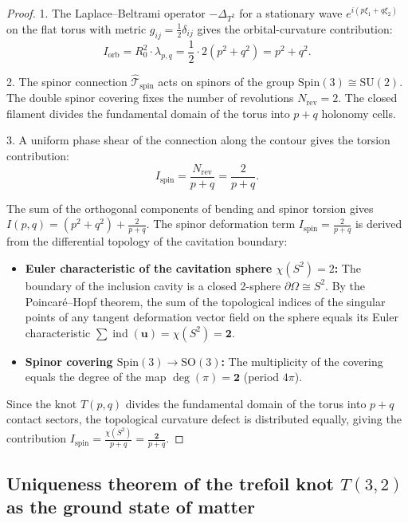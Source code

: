 \documentclass[11pt,a4paper]{article}
\theoremstyle{definition}
\theoremstyle{remark}
\begin{document}
	
\begin{proof}
	1. The Laplace--Beltrami operator $-\Delta_{T^2}$ for a stationary wave $e^{i(p\xi_1 + q\xi_2)}$ on the flat torus with metric $g_{ij} = \frac{1}{2}\delta_{ij}$ gives the orbital-curvature contribution:
\begin{equation}
	I_{\mathrm{orb}} = R_0^2 \cdot \lambda_{p,q} = \frac{1}{2} \cdot 2(p^2 + q^2) = p^2 + q^2.
\end{equation}

2. The spinor connection $\hat{\mathcal{T}}_{\mathrm{spin}}$ acts on spinors of the group $\mathrm{Spin}(3) \cong \mathrm{SU}(2)$. The double spinor covering fixes the number of revolutions $N_{\mathrm{rev}} = 2$. The closed filament divides the fundamental domain of the torus into $p+q$ holonomy cells.

3. A uniform phase shear of the connection along the contour gives the torsion contribution:
\begin{equation}
	I_{\mathrm{spin}} = \frac{N_{\mathrm{rev}}}{p + q} = \frac{2}{p + q}.
\end{equation}

The sum of the orthogonal components of bending and spinor torsion gives $I(p, q) = (p^2 + q^2) + \frac{2}{p+q}$.
The spinor deformation term $I_{\mathrm{spin}} = \frac{2}{p+q}$ is derived from the differential topology of the cavitation boundary:
\begin{itemize}
\item \textbf{Euler characteristic of the cavitation sphere $\chi(S^2) = 2$:} The boundary of the inclusion cavity is a closed 2-sphere $\partial\Omega \cong S^2$. By the Poincaré--Hopf theorem, the sum of the topological indices of the singular points of any tangent deformation vector field on the sphere equals its Euler characteristic $\sum \operatorname{ind}(\mathbf{u}) = \chi(S^2) = \mathbf{2}$.
\item \textbf{Spinor covering $\mathrm{Spin}(3) \to \mathrm{SO}(3)$:} The multiplicity of the covering equals the degree of the map $\deg(\pi) = \mathbf{2}$ (period $4\pi$).
\end{itemize}
Since the knot $T(p,q)$ divides the fundamental domain of the torus into $p+q$ contact sectors, the topological curvature defect is distributed equally, giving the contribution $I_{\mathrm{spin}} = \frac{\chi(S^2)}{p+q} = \frac{\mathbf{2}}{p+q}$.

\end{proof}
	
\subsection{Uniqueness theorem of the trefoil knot $T(3,2)$ as the ground state of matter}
	
\end{document}
